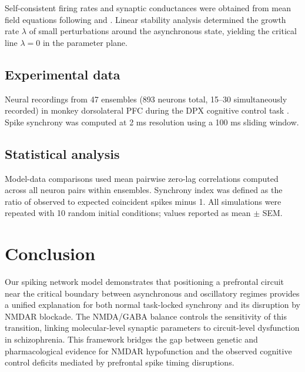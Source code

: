 \documentclass[11pt]{article}
\begin{document}
Self-consistent firing rates and synaptic conductances were obtained from mean field equations following \citet{brunel2000} and \citet{brunel2003}. Linear stability analysis determined the growth rate $\lambda$ of small perturbations around the asynchronous state, yielding the critical line $\lambda = 0$ in the parameter plane.

\subsection{Experimental data}

Neural recordings from 47 ensembles (893 neurons total, 15--30 simultaneously recorded) in monkey dorsolateral PFC during the DPX cognitive control task \citep{zick2018}. Spike synchrony was computed at 2 ms resolution using a 100 ms sliding window.

\subsection{Statistical analysis}

Model-data comparisons used mean pairwise zero-lag correlations computed across all neuron pairs within ensembles. Synchrony index was defined as the ratio of observed to expected coincident spikes minus 1. All simulations were repeated with 10 random initial conditions; values reported as mean $\pm$ SEM.

\section{Conclusion}

Our spiking network model demonstrates that positioning a prefrontal circuit near the critical boundary between asynchronous and oscillatory regimes provides a unified explanation for both normal task-locked synchrony and its disruption by NMDAR blockade. The NMDA/GABA balance controls the sensitivity of this transition, linking molecular-level synaptic parameters to circuit-level dysfunction in schizophrenia. This framework bridges the gap between genetic and pharmacological evidence for NMDAR hypofunction and the observed cognitive control deficits mediated by prefrontal spike timing disruptions.



\end{document}
